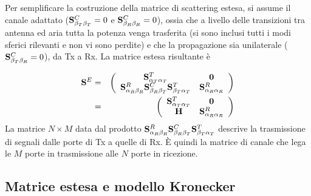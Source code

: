 \documentclass[technote]{IEEEtran}
\begin{document}
Per semplificare la costruzione della matrice di scattering estesa, si assume il canale adattato (${\bf{S}}_{{\beta _T}{\beta _T}}^C = 0$ e ${\bf{S}}_{{\beta _R}{\beta _R}}^C = 0$), ossia che a livello delle transizioni tra antenna ed aria tutta la potenza venga trasferita (si sono inclusi tutti i modi sferici rilevanti e non vi sono perdite) e che la propagazione sia unilaterale (${\bf{S}}_{{\beta _T}{\beta _R}}^C = 0$), da Tx a Rx. La matrice estesa risultante è 

\begin{eqnarray}
{{\bf{S}}^E} & = & \left( {\begin{array}{*{20}{c}} {{\bf{S}}_{{\alpha_T}{\alpha _T}}^T}&{\bf{0}}\\ {{\bf{S}}_{{\alpha_R}{\beta_R}}^R{\bf{S}}_{{\beta_R}{\beta_T}}^C{\bf{S}}_{{\beta_T}{\alpha_T}}^T}&{{\bf{S}}_{{\alpha_R}{\alpha_R}}^R}\end{array}} \right) \nonumber \\
& = & \left( {\begin{array}{*{20}{c}} {{\bf{S}}_{{\alpha _T}{\alpha _T}}^T}&{\bf{0}}\\ {\bf{H}}&{{\bf{S}}_{{\alpha _R}{\alpha _R}}^R} \end{array}} \right) \nonumber
\end{eqnarray} La matrice $N \times M$ data dal prodotto ${\bf{S}}_{{\alpha _R}{\beta _R}}^R{\bf{S}}_{{\beta _R}{\beta _T}}^C{\bf{S}}_{{\beta _T}{\alpha _T}}^T$ descrive la trasmissione di segnali dalle porte di Tx a quelle di Rx. È quindi la matrice di canale che lega le $M$ porte in trasmissione alle $N$ porte in ricezione.

\subsection{Matrice estesa e modello Kronecker}
\end{document}
